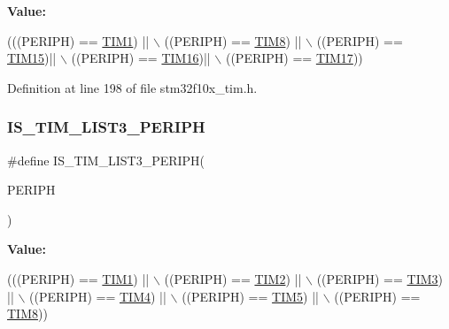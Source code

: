 {\bfseries Value\+:}
\begin{DoxyCode}
(((PERIPH) == \hyperlink{group___peripheral__declaration_ga2e87451fea8dc9380056d3cfc5ed81fb}{TIM1}) || \(\backslash\)
                                     ((PERIPH) == \hyperlink{group___peripheral__declaration_ga9a3660400b17735e91331f256095810e}{TIM8}) || \(\backslash\)
                                     ((PERIPH) == \hyperlink{group___peripheral__declaration_ga87e4b442041d1c03a6af113fbe04a182}{TIM15})|| \(\backslash\)
                                     ((PERIPH) == \hyperlink{group___peripheral__declaration_ga73ec606e7dacf17e18c661e8ff8c7c8d}{TIM16})|| \(\backslash\)
                                     ((PERIPH) == \hyperlink{group___peripheral__declaration_ga65aea6c8b36439e44ad6cde0e6891aab}{TIM17}))
\end{DoxyCode}


Definition at line 198 of file stm32f10x\+\_\+tim.\+h.

\mbox{\label{group___t_i_m___exported__constants_ga2d80541c542755ac3f2aca078bd98adb}} 
\subsubsection{\texorpdfstring{I\+S\+\_\+\+T\+I\+M\+\_\+\+L\+I\+S\+T3\+\_\+\+P\+E\+R\+I\+PH}{IS\_TIM\_LIST3\_PERIPH}}
{\footnotesize\ttfamily \#define I\+S\+\_\+\+T\+I\+M\+\_\+\+L\+I\+S\+T3\+\_\+\+P\+E\+R\+I\+PH(\begin{DoxyParamCaption}\item[{}]{P\+E\+R\+I\+PH }\end{DoxyParamCaption})}

{\bfseries Value\+:}
\begin{DoxyCode}
(((PERIPH) == \hyperlink{group___peripheral__declaration_ga2e87451fea8dc9380056d3cfc5ed81fb}{TIM1}) || \(\backslash\)
                                     ((PERIPH) == \hyperlink{group___peripheral__declaration_ga3cfac9f2e43673f790f8668d48b4b92b}{TIM2}) || \(\backslash\)
                                     ((PERIPH) == \hyperlink{group___peripheral__declaration_ga61ee4c391385607d7af432b63905fcc9}{TIM3}) || \(\backslash\)
                                     ((PERIPH) == \hyperlink{group___peripheral__declaration_ga91a09bad8bdc7a1cb3d85cf49c94c8ec}{TIM4}) || \(\backslash\)
                                     ((PERIPH) == \hyperlink{group___peripheral__declaration_ga5125ff6a23a2ed66e2e19bd196128c14}{TIM5}) || \(\backslash\)
                                     ((PERIPH) == \hyperlink{group___peripheral__declaration_ga9a3660400b17735e91331f256095810e}{TIM8}))
\end{DoxyCode}


